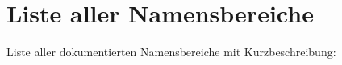 \section{Liste aller Namensbereiche}
Liste aller dokumentierten Namensbereiche mit Kurzbeschreibung\-:\begin{DoxyCompactList}
\item{}
\end{DoxyCompactList}
